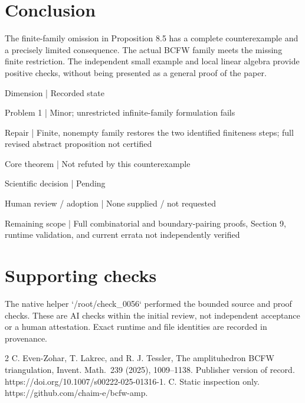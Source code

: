 \documentclass[10pt]{article}
\begin{document}
\section*{Conclusion}
The finite-family omission in Proposition 8.5 has a complete counterexample and a precisely limited consequence. The actual BCFW family meets the missing finite restriction. The independent small example and local linear algebra provide positive checks, without being presented as a general proof of the paper.\par
Dimension | Recorded state\par
Problem 1 | Minor; unrestricted infinite-family formulation fails\par
Repair | Finite, nonempty family restores the two identified finiteness steps; full revised abstract proposition not certified\par
Core theorem | Not refuted by this counterexample\par
Scientific decision | Pending\par
Human review / adoption | None supplied / not requested\par
Remaining scope | Full combinatorial and boundary-pairing proofs, Section 9, runtime validation, and current errata not independently verified\par
\section*{Supporting checks}
The native helper `/root/check\_0056` performed the bounded source and proof checks. These are AI checks within the initial review, not independent acceptance or a human attestation. Exact runtime and file identities are recorded in provenance.\par
2 C. Even-Zohar, T. Lakrec, and R. J. Tessler, The amplituhedron BCFW triangulation, Invent. Math. 239 (2025), 1009–1138. Publisher version of record. https://doi.org/10.1007/s00222-025-01316-1. C. Static inspection only. https://github.com/chaim-e/bcfw-amp.\par
\end{document}
